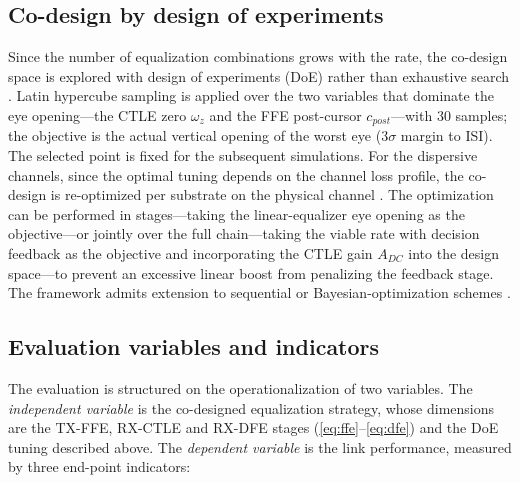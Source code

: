\documentclass[preprint,review,12pt]{elsarticle}
\begin{document}
\subsection{Co-design by design of experiments}
Since the number of equalization combinations grows with the rate, the
co-design space is explored with design of experiments (DoE) rather than
exhaustive search \citep{7851249,5770781}. Latin hypercube sampling is
applied over the two variables that dominate the eye opening---the CTLE
zero $\omega_z$ and the FFE post-cursor $c_{post}$---with 30 samples; the
objective is the actual vertical opening of the worst eye ($3\sigma$
margin to ISI). The selected point is fixed for the subsequent
simulations. For the dispersive channels, since the optimal tuning depends
on the channel loss profile, the co-design is re-optimized per substrate
on the physical channel \citep{11169790}. The optimization can be performed
in stages---taking the linear-equalizer eye opening as the
objective---or jointly over the full chain---taking the viable rate with
decision feedback as the objective and incorporating the CTLE gain
$A_{DC}$ into the design space---to prevent an excessive linear boost from
penalizing the feedback stage. The framework admits extension to
sequential or Bayesian-optimization schemes \citep{11309336}.

\subsection{Evaluation variables and indicators}
The evaluation is structured on the operationalization of two variables.
The \emph{independent variable} is the co-designed equalization strategy,
whose dimensions are the TX-FFE, RX-CTLE and RX-DFE stages
(\eqref{eq:ffe}--\eqref{eq:dfe}) and the DoE tuning described above. The
\emph{dependent variable} is the link performance, measured by three
end-point indicators:
\end{document}
